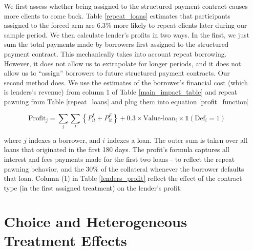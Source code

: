\documentclass[12pt, a4paper]{article}
\begin{document}
We first assess whether being assigned to the structured payment contract causes more clients to come back. Table \ref{repeat_loans} estimates that participants assigned to the forced arm are 6.3\% more likely to repeat clients later during our sample period.  We then calculate lender's profits in two ways. In the first, we just sum the total payments made by borrowers first assigned to the structured payment contract. This mechanically takes into account repeat borrowing. However, it does not allow us to extrapolate for longer periods, and it does not allow us to ``assign'' borrowers to future structured payment contracts. Our second method does. We use the estimates of the borrower's financial cost (which is lenders's revenue) from column 1 of Table \ref{main_impact_table} and repeat pawning from Table \ref{repeat_loans} and plug them into equation \ref{profit_function}

\begin{equation}
\label{profit_function}
     \text{Profit}_j = \sum_{i}\sum_{t}\left\{P_{it}^I+P_{it}^F\right\}+0.3\times \text{Value-loan}_i \times\mathds{1}(\text{Def}_i=1)
\end{equation}

where $j$ indexes a borrower, and $i$ indexes a loan. The outer sum is taken over all loans that originated in the first 180 days. The profit's formula captures all interest and fees payments made for the first two loans -  to reflect the repeat pawning behavior, and the 30\% of the collateral whenever the borrower defaults that loan. Column (1) in Table \ref{lenders_profit} reflect the effect of the contract type (in the first assigned treatment) on the lender's profit. 




\section{Choice and Heterogeneous Treatment Effects}
\label{Choice}
\end{document}
